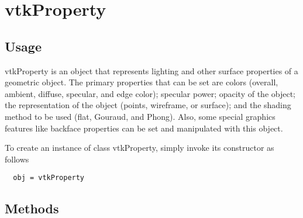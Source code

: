 \section{vtkProperty}

\subsection{Usage}

 vtkProperty is an object that represents lighting and other surface
 properties of a geometric object. The primary properties that can be 
 set are colors (overall, ambient, diffuse, specular, and edge color);
 specular power; opacity of the object; the representation of the
 object (points, wireframe, or surface); and the shading method to be 
 used (flat, Gouraud, and Phong). Also, some special graphics features
 like backface properties can be set and manipulated with this object.

To create an instance of class vtkProperty, simply
invoke its constructor as follows
\begin{verbatim}
  obj = vtkProperty
\end{verbatim}
\subsection{Methods}

